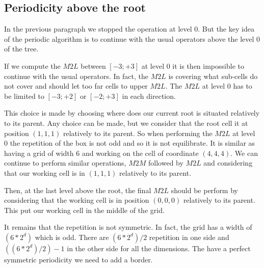 \documentclass[12pt]{article} %
\begin{document}
\subsection{Periodicity above the root}
In the previous paragraph we stopped the operation at level $0$.
But the key idea of the periodic algorithm is to continue with the usual operators above the level $0$ of the tree.

If we compute the $M2L$ between $[-3;+3]$ at level $0$ it is then impossible to continue with the usual operators.
In fact, the $M2L$ is covering what sub-cells do not cover and should let too far cells to upper $M2L$.
The $M2L$ at level $0$ has to be limited to $[-3;+2]$ or $[-2;+3]$ in each direction.

This choice is made by choosing where does our current root is situated relatively to its parent.
Any choice can be made, but we consider that the root cell it at position $(1,1,1)$ relatively to its parent.
So when performing the $M2L$ at level $0$ the repetition of the box is not odd and so it is not equilibrate.
It is similar as having a grid of width $6$ and working on the cell of coordinate $(4,4,4)$.
We can continue to perform similar operations, $M2M$ followed by $M2L$ and considering that our working cell is in $(1,1,1)$ relatively to its parent.

Then, at the last level above the root, the final $M2L$ should be perform by considering that the working cell is in position $(0,0,0)$ relatively to its parent.
This put our working cell in the middle of the grid.

It remains that the repetition is not symmetric.
In fact, the grid has a width of $(6*2^d)$ which is odd.
There are $(6*2^d)/2$ repetition in one side and $((6*2^d)/2)-1$ in the other side for all the dimensions.
The have a perfect symmetric periodicity we need to add a border.
\end{document}
